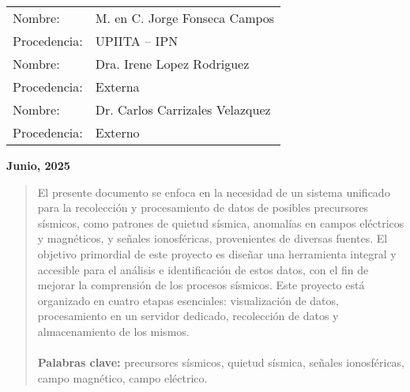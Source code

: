 \begin{titlepage}
\begin{center}
            \vfill


            \begin{center}
                \begin{tabular}{>{\raggedright\arraybackslash}p{3cm} p{10cm}}
                  Nombre:      & M. en C. Jorge Fonseca Campos\\
                  Procedencia: & UPIITA – IPN \\
                  Nombre:      & Dra. Irene Lopez Rodriguez \\
                  Procedencia: & Externa  \\
                    Nombre:      & Dr. Carlos Carrizales Velazquez \\
                  Procedencia: & Externo  \\
                \end{tabular}
            \end{center}

            \vfill
            \textbf{Junio, 2025}

 
        \end{center}
    \begin{abstract}
    El presente documento se enfoca en la necesidad de un sistema unificado para la recolección y procesamiento de datos de posibles precursores sísmicos, como patrones de quietud sísmica, anomalías en campos eléctricos y magnéticos, y señales ionosféricas, provenientes de diversas fuentes. El objetivo primordial de este proyecto es diseñar una herramienta integral y accesible para el análisis e identificación de estos datos, con el fin de mejorar la comprensión de los procesos sísmicos. Este proyecto está organizado en cuatro etapas esenciales: visualización de datos, procesamiento en un servidor dedicado, recolección de datos y almacenamiento de los mismos.
        \\ \\
        \textbf{Palabras clave:} precursores sísmicos, quietud sísmica, señales ionosféricas, campo magnético, campo eléctrico.
    \end{abstract}
        
    \end{titlepage}